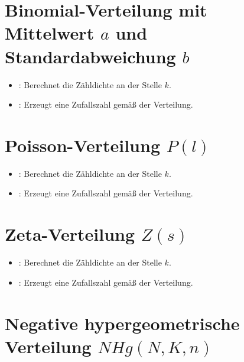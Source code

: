 \section{Binomial-Verteilung mit Mittelwert \texorpdfstring{$a$}{a} und Standardabweichung \texorpdfstring{$b$}{b}}

\begin{itemize}

\item
{}:
Berechnet die Zähldichte an der Stelle $k$.


\item
{}:
Erzeugt eine Zufallszahl gemäß der Verteilung.

\end{itemize}



\section{Poisson-Verteilung \texorpdfstring{$P(l)$}{P(l)}}

\begin{itemize}

\item
{}:
Berechnet die Zähldichte an der Stelle $k$.

\item
{}:
Erzeugt eine Zufallszahl gemäß der Verteilung.

\end{itemize}



\section{Zeta-Verteilung \texorpdfstring{$Z(s)$}{Z(s)}}

\begin{itemize}

\item
{}:
Berechnet die Zähldichte an der Stelle $k$.

\item
{}:
Erzeugt eine Zufallszahl gemäß der Verteilung.

\end{itemize}



\section{Negative hypergeometrische Verteilung \texorpdfstring{$NHg(N,K,n)$}{NHg(N,K,n)}}

